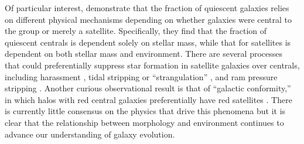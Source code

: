 Of particular interest, \cite{Peng2010} demonstrate that the fraction of quiescent galaxies relies on different physical mechanisms depending on whether galaxies were central to the group or merely a satellite. Specifically, they find that the fraction of quiescent centrals is dependent solely on stellar mass, while that for satellites is dependent on both stellar mass and environment.  There are several processes that could preferentially suppress star formation in satellite galaxies over centrals, including harassment \citep{Moore1996}, tidal stripping or ``strangulation'' \citep{Kawata2008}, and ram pressure stripping \citep{Gunn1972}. Another curious observational result is that of ``galactic conformity,'' in which halos with red central galaxies preferentially have red satellites \citep{Weinmann2006}. There is currently little consensus on the physics that drive this phenomena \citep{Kauffmann2013,Hearin2015,Hearin2016,Pahwa2017} but it is clear that the relationship between morphology and environment continues to advance our understanding of galaxy evolution.



